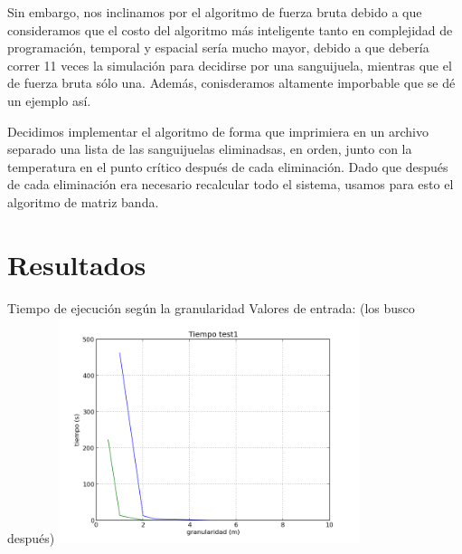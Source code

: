 \documentclass[spanish,a4paper]{article}
\begin{document}
Sin embargo, nos inclinamos por el algoritmo de fuerza bruta debido a que consideramos que el costo del algoritmo más inteligente tanto en complejidad de programación, temporal y espacial sería mucho mayor, debido a que debería correr 11 veces la simulación para decidirse por una sanguijuela, mientras que el de fuerza bruta sólo una. Además, conisderamos altamente imporbable que se dé un ejemplo así.

Decidimos implementar el algoritmo de forma que imprimiera en un archivo separado una lista de las sanguijuelas eliminadsas, en orden, junto con la temperatura en el punto crítico después de cada eliminación. Dado que después de cada eliminación era necesario recalcular todo el sistema, usamos para esto el algoritmo de matriz banda. \newline \newline


\newpage

\section{Resultados}
\label{sec:res}

Tiempo de ejecución según la granularidad
Valores de entrada: (los busco después)
\includegraphics[width=250pt]{test.png}



%
\end{document}
